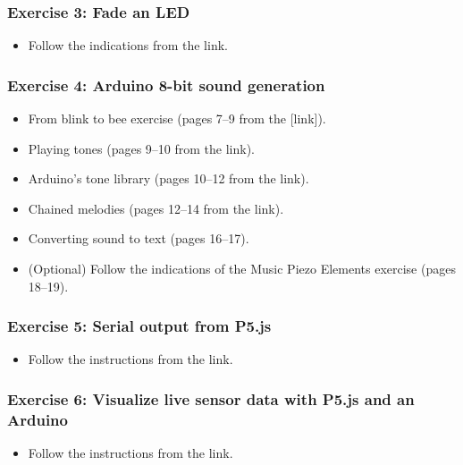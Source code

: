 \documentclass[screen, aspectratio=43]{beamer}
\begin{document}
%
\begin{frame}
  \frametitle{Exercise 3: Fade an LED}
    \begin{itemize}
    	\item Follow the indications from the link.
    \end{itemize}
\end{frame}
%
\begin{frame}
  \frametitle{Exercise 4: Arduino 8-bit sound generation}
    \begin{itemize}
    	\item From blink to bee exercise (pages 7--9 from the [link]).
	\item Playing tones (pages 9--10 from the link).
	\item Arduino's tone library (pages 10--12 from the link).
	\item Chained melodies (pages 12--14 from the link).
	\item Converting sound to text (pages 16--17).
    	\item (Optional) Follow the indications of the Music Piezo Elements exercise (pages 18--19).
    \end{itemize}
\end{frame}
%
\begin{frame}
  \frametitle{Exercise 5: Serial output from P5.js}
    \begin{itemize}
    	\item Follow the instructions from the link.
    \end{itemize}
\end{frame}
%
\begin{frame}
  \frametitle{Exercise 6: Visualize live sensor data with P5.js and an Arduino}
    \begin{itemize}
    	\item Follow the instructions from the link.
    \end{itemize}
\end{frame}
%
%
%
\end{document}
